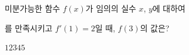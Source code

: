 미분가능한 함수 $f(x)$가 임의의 실수 $x$, $y$에 대하여 \par\smallskip{}\par\smallskip\noindent 를 만족시키고 $f'(1)=2$일 때, $f(3)$의 값은?
\begin{choices32}{$1$}{$2$}{$3$}{$4$}{$5$}\end{choices32}
